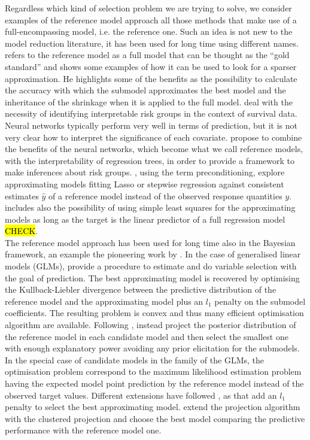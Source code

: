 \documentclass[american,]{article}
\theoremstyle{definition}
\begin{document}
Regardless which kind of selection problem we are trying to solve, we consider examples of the reference model approach all those methods that make use of a full-encompassing model, i.e. the reference one. Such an idea is not new to the model reduction literature, it has been used for long time using different names. \cite{book:harrell} refers to the reference model as a full model that can be thought as the ``gold standard'' and shows some examples of how it can be used to look for a sparser approximation. He highlights some of the benefits as the possibility to calculate the accuracy with which the submodel approximates the best model and the inheritance of the shrinkage when it is applied to the full model. \cite{paper:faraggi_nn} deal with the necessity of identifying interpretable risk groups in the context of survival data. Neural networks typically perform very well in terms of prediction, but it is not very clear how to interpret the significance of each covariate. \cite{paper:faraggi_nn} propose to combine the benefits of the neural networks, which become what we call reference models, with the interpretability of regression trees, in order to provide a framework to make inferences about risk groups. \cite{paper:paul_preconditioning}, using the term preconditioning, explore approximating models fitting Lasso \citep{paper:tibshirani_lasso} or stepwise regression against consistent estimates $\hat{y}$ of a reference model instead of the observed response quantities $y$. \cite{book:harrell} includes also the possibility of using simple least squares for the approximating models as long as the target is the linear predictor of a full regression model \hl{CHECK}.
\\
The reference model approach has been used for long time also in the Bayesian framework, an example the pioneering work by \cite{paper:reference_lindley}. In the case of generalised linear models (GLMs), \cite{paper:tran_predictivelasso} provide a procedure to estimate and do variable selection with the goal of prediction. The best approximating model is recovered by optimising the Kullback-Liebler divergence between the predictive distribution of the reference model and the approximating model plus an $l_{1}$ penalty on the submodel coefficients. The resulting problem is convex and thus many efficient optimisation algorithm are available. Following \cite{paper:goutis_projection}, \cite{paper:original_proj}  instead project the posterior distribution of the reference model in each candidate model and then select the smallest one with enough explanatory power avoiding any prior elicitation for the submodels. In the special case of candidate models in the family of the GLMs, the optimisation problem correspond to the maximum likelihood estimation problem having the expected model point prediction by the reference model instead of the observed target values. Different extensions have followed \cite{paper:original_proj}, as \cite{paper:nott_projection} that add an $l_{1}$ penalty to select the best approximating model. \cite{paper:projpred} extend the projection algorithm with the clustered projection and choose the best model comparing the predictive performance with the reference model one.
\end{document}

